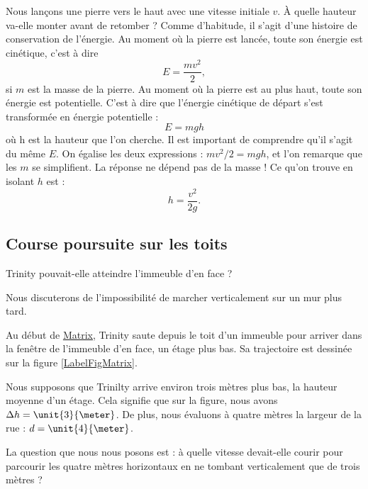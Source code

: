 Nous lançons une pierre vers le haut avec une vitesse initiale $v$. À quelle hauteur va-elle monter avant de retomber ? Comme d'habitude, il s'agit d'une histoire de conservation de l'énergie. Au moment où la pierre est lancée, toute son énergie est cinétique, c'est à dire
\[ 
  E=\frac{ mv^2 }{ 2 },
\]
si $m$ est la masse de la pierre. Au moment où la pierre est au plus haut, toute son énergie est potentielle. C'est à dire que l'énergie cinétique de départ s'est transformée en énergie potentielle :
\[ 
  E=mgh
\]
 où h est la hauteur que l'on cherche. Il est important de comprendre qu'il s'agit du même $E$. On égalise les deux expressions : $mv^2/2=mgh$, et l'on remarque que les $m$ se simplifient. La réponse ne dépend pas de la masse ! Ce qu'on trouve en isolant $h$ est :
\begin{equation}
h=\frac{ v^2 }{ 2g }.
\end{equation}  

\subsection{Course poursuite sur les toits}

\begin{pourquoidonc}
	Trinity pouvait-elle atteindre l'immeuble d'en face ? 
	
	Nous discuterons de l'impossibilité de marcher verticalement sur un mur plus tard.
\end{pourquoidonc}

Au début de \href{http://fr.wikipedia.org/wiki/Matrix}{Matrix}, Trinity saute depuis le toit d'un immeuble pour arriver dans la fenêtre de l'immeuble d'en face, un étage plus bas. Sa trajectoire est dessinée sur la figure \ref{LabelFigMatrix}.
\newcommand{\CaptionFigMatrix}{La trajectoire suivie par Trinity.}

Nous supposons que Trinilty arrive environ trois mètres plus bas, la hauteur moyenne d'un étage. Cela signifie que sur la figure, nous avons $\Delta h=\unit{3}{\meter}$. De plus, nous évaluons à quatre mètres la largeur de la rue : $d=\unit{4}{\meter}$.

La question que nous nous posons est : à quelle vitesse devait-elle courir pour parcourir les quatre mètres horizontaux en ne tombant verticalement que de trois mètres ?

